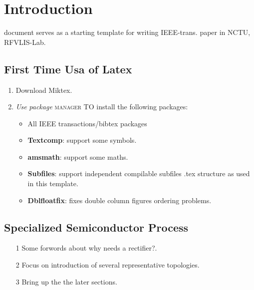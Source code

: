 \documentclass[rfvlsi_template_jrnl.tex]{subfiles}
\begin{document}
\section{Introduction}
% 
% 
% 
% 


 document serves as a starting template for writing IEEE-trans. paper in NCTU, RFVLIS-Lab.

\subsection{First Time Usa of Latex}

\begin{enumerate}
  \item Download Miktex.
  \item \textit{Use} \emph{package} \textsc{manager} \uppercase{to} install the following packages:
	\begin{itemize}
		\item All IEEE transactions/bibtex packages
		\item \textbf{Textcomp}: support some symbols.
		\item \textbf{amsmath}: support some maths. 
		\item \textbf{Subfiles}: support independent compilable subfiles .tex structure as used in this template. 
		\item \textbf{Dblfloatfix}: fixes double column figures ordering problems.
	\end{itemize}
\end{enumerate}

\subsection{Specialized Semiconductor Process}

\begin{itemize}
\item[1] Some forwords about why needs a rectifier?.
\item[2] Focus on introduction of several representative topologies.
\item[3] Bring up the the later sections.
\end{itemize}
\end{document}
